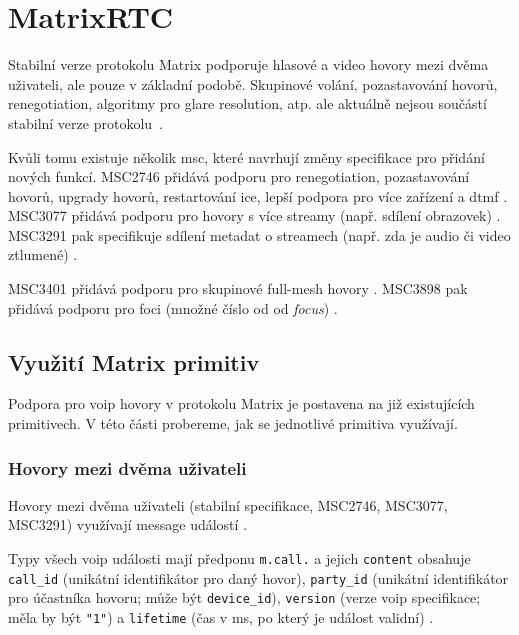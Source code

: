 \section{MatrixRTC}\label{matrixRTC}

Stabilní verze protokolu Matrix podporuje hlasové a video hovory mezi dvěma
uživateli, ale pouze v základní podobě. Skupinové volání, pozastavování hovorů,
renegotiation, algoritmy pro glare resolution, atp. ale aktuálně nejsou součástí
stabilní verze protokolu~\parencite{MatrixORG-Spec}.

Kvůli tomu existuje několik \gls{msc}, které navrhují změny specifikace pro
přidání nových funkcí. MSC2746 přidává podporu pro renegotiation, pozastavování
hovorů, upgrady hovorů, restartování \gls{ice}, lepší podpora pro více zařízení
a \gls{dtmf} \parencite{GitHub-MSC2746}. MSC3077 přidává podporu pro hovory s
více streamy (např. sdílení obrazovek) \parencite{GitHub-MSC3077}. MSC3291 pak
specifikuje sdílení metadat o streamech (např. zda je audio či video ztlumené)
\parencite{GitHub-MSC3291}.

MSC3401 přidává podporu pro skupinové full-mesh hovory
\parencite{GitHub-MSC3401}. MSC3898 pak přidává podporu pro foci (množné číslo
od od \textit{focus}) \parencite{GitHub-MSC3898}.

\subsection{Využití Matrix primitiv}

Podpora pro \gls{voip} hovory v protokolu Matrix je postavena na již
existujících primitivech. V této části probereme, jak se jednotlivé primitiva
využívají.

\subsubsection{Hovory mezi dvěma uživateli}\label{dmCalls}

Hovory mezi dvěma uživateli (stabilní specifikace, MSC2746, MSC3077, MSC3291)
využívají message událostí
\parencite{MatrixORG-Spec,GitHub-MSC2746,GitHub-MSC3077,GitHub-MSC3291}.

Typy všech \gls{voip} události mají předponu \texttt{m.call.} a jejich
\texttt{content} obsahuje \texttt{call_id} (unikátní
identifikátor pro daný hovor), \texttt{party_id} (unikátní
identifikátor pro účastníka hovoru; může být \texttt{device_id}),
\texttt{version} (verze \gls{voip} specifikace; měla by být
\texttt{"1"}) a \texttt{lifetime} (čas v
\unit{\milli\second}, po který je událost validní)
\parencite{MatrixORG-Spec,GitHub-MSC2746}.

